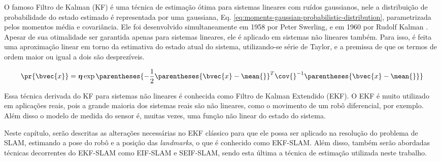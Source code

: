 O famoso Filtro de Kalman (KF) é uma técnica de estimação ótima para sistemas lineares com ruídos gaussianos, nele a distribuição de probabilidade do estado estimado é representada por uma gaussiana, 
Eq. \ref{eq:moments-gaussian-probabilistic-distribution}, parametrizada pelos momentos média e covariância. Ele foi desenvolvido simultaneamente em 1958 por Peter Swerling, e em 1960 por Rudolf Kalman \cite[p.~40]{bongard2006probabilistic}. Apesar de sua otimalidade ser garantida apenas para sistemas lineares, ele é aplicado em sistemas não lineares também. Para isso, é feita uma aproximação linear em torno da estimativa do estado atual do sistema, utilizando-se série de Taylor, e a premissa de que os termos de ordem maior ou igual a dois são desprezíveis.

\begin{equation}
  \pr{\bvec{x}} = \boldsymbol{\eta} \exp\parentheses{-\frac{1}{2} 
  \parentheses{\bvec{x} - \mean{}}^T \cov{}^{-1}\parentheses{\bvec{x} - \mean{}}}
  \label{eq:moments-gaussian-probabilistic-distribution}
\end{equation}

Essa técnica derivada do KF para sistemas não lineares é conhecida como Filtro de Kalman Extendido (EKF). O EKF é muito utilizado em aplicações reais, pois a grande maioria dos sistemas reais são não lineares, como o movimento de um robô diferencial, por exemplo. Além disso o modelo de medida do sensor é, muitas vezes, uma função não linear do estado do sistema.

Neste capítulo, serão descritas as alterações necessárias no EKF clássico para que ele possa ser aplicado na resolução do problema de SLAM, estimando a pose do robô e a posição das \textit{landmarks}, o que é conhecido como EKF-SLAM. Além disso, também serão abordadas técnicas decorrentes do EKF-SLAM como EIF-SLAM e SEIF-SLAM, sendo esta última a técnica de estimação utilizada neste trabalho.

